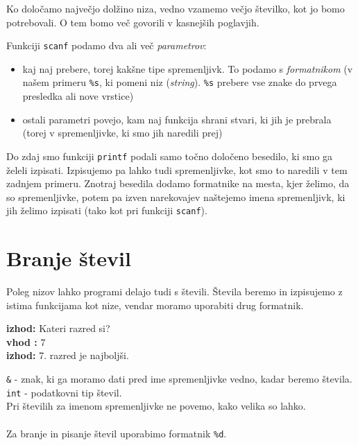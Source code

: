 \documentclass{book}
\begin{document}
\begin{errors} %
Ko določamo največjo dolžino niza, vedno vzamemo večjo številko, kot jo bomo potrebovali. O tem bomo več govorili v kasnejših poglavjih.
\end{errors}


Funkciji \verb+scanf+ podamo dva ali več \emph{parametrov}:
\begin{itemize}
	\item kaj naj prebere, torej kakšne tipe spremenljivk. To podamo s \emph{formatnikom} (v našem primeru \verb+%s+, ki pomeni niz (\emph{string}). \verb+%s+ prebere vse znake do prvega presledka ali nove vrstice)
	\item ostali parametri povejo, kam naj funkcija shrani stvari, ki jih je prebrala (torej v spremenljivke, ki smo jih naredili prej)
\end{itemize}


Do zdaj smo funkciji \verb+printf+ podali samo točno določeno besedilo, ki smo ga želeli izpisati. Izpisujemo pa lahko tudi spremenljivke, kot smo to naredili v tem zadnjem primeru. Znotraj besedila dodamo formatnike na mesta, kjer želimo, da so spremenljivke, potem pa izven narekovajev naštejemo imena spremenljivk, ki jih želimo izpisati (tako kot pri funkciji \verb+scanf+).

\section{Branje števil}
Poleg nizov lahko programi delajo tudi s števili. Števila beremo in izpisujemo z istima funkcijama kot nize, vendar moramo uporabiti drug formatnik.

\begin{examples}


\begin{inout}
{\color{blue} \bf izhod:} Kateri razred si?\\
{\color{blue} \bf vhod :} 7\\
{\color{blue} \bf izhod:} 7. razred je najboljši.
\end{inout}

\end{examples}

\verb+&+ - znak, ki ga moramo dati pred ime spremenljivke vedno, kadar beremo števila.\\
\verb+int+ - podatkovni tip števil. \\
Pri številih za imenom spremenljivke ne povemo, kako velika so lahko. \\\\
Za branje in pisanje števil uporabimo formatnik \verb+%d+.
\end{document}

